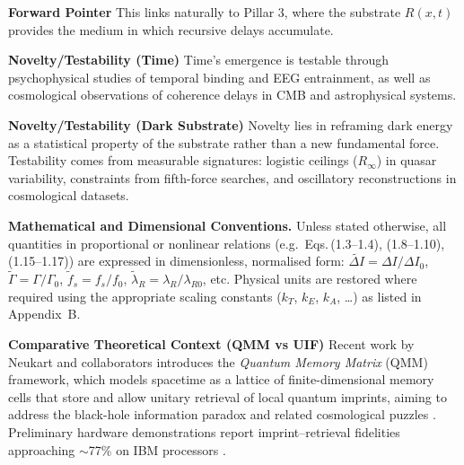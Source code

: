\noindent \textbf {Forward Pointer} 
\newline 
This links naturally to Pillar 3, where the substrate $R(x,t)$ provides the medium in which recursive delays accumulate.
\newline

\noindent \textbf {Novelty/Testability (Time)} 
\newline
Time’s emergence is testable through psychophysical studies of temporal binding and EEG entrainment, as well as cosmological observations of coherence delays in CMB and astrophysical systems.
\newline

\noindent \textbf {Novelty/Testability (Dark Substrate)}
\newline
Novelty lies in reframing dark energy as a statistical property of the substrate rather than a new fundamental force. Testability comes from measurable signatures: logistic ceilings ($R_\infty$) in quasar variability, constraints from fifth-force searches, and oscillatory reconstructions in cosmological datasets.
\newline

\noindent\textbf{Mathematical and Dimensional Conventions.}
\newline
\noindent Unless stated otherwise, all quantities in proportional or nonlinear relations
(e.g.\ Eqs.\,(1.3–1.4), (1.8–1.10), (1.15–1.17)) are expressed in dimensionless,
normalised form:
$\tilde{\Delta I}=\Delta I/\Delta I_0$, $\tilde{\Gamma}=\Gamma/\Gamma_0$,
$\tilde{f}_s=f_s/f_0$, $\tilde{\lambda}_R=\lambda_R/\lambda_{R0}$, etc.
Physical units are restored where required using the appropriate scaling constants
($k_T$, $k_E$, $k_A$, \ldots) as listed in Appendix~B.
\newline

\noindent\textbf{Comparative Theoretical Context (QMM vs UIF)}
\newline
\noindent Recent work by Neukart and collaborators introduces the \textit{Quantum Memory Matrix} (QMM) framework, which models spacetime as a lattice of finite-dimensional memory cells that store and allow unitary retrieval of local quantum imprints, aiming to address the black-hole information paradox and related cosmological puzzles \cite{Neukart2025_QMM,Neukart2025_QMM_Imprint,Neukart2025_QMM_SM,Neukart2025_QMM_PBH}. Preliminary hardware demonstrations report imprint–retrieval fidelities approaching $\sim$77\% on IBM processors \cite{Neukart2025_QMM_Imprint}. 

